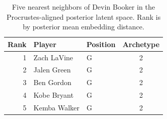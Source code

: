 \begin{table}[htbp]
  \centering\small
  \begin{tabular}{rllc}
    \toprule
    Rank & Player & Position & Archetype \\
    \midrule
    1 & Zach LaVine & G & 2 \\
    2 & Jalen Green & G & 2 \\
    3 & Ben Gordon & G & 2 \\
    4 & Kobe Bryant & G & 2 \\
    5 & Kemba Walker & G & 2 \\
    \bottomrule
  \end{tabular}
  \caption{Five nearest neighbors of Devin Booker in the Procrustes-aligned posterior latent space. Rank is by posterior mean embedding distance.}
  \label{tab:Devin_Booker_neighbors}
\end{table}

